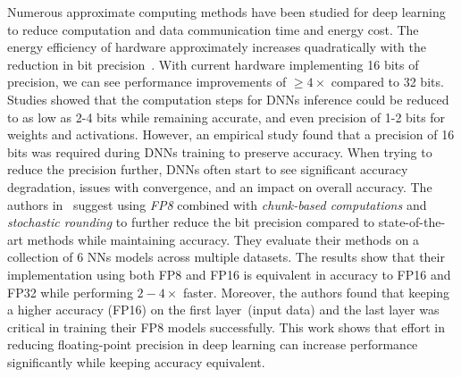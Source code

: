 Numerous approximate computing methods have been studied for deep learning to
reduce computation and data communication time and energy cost.
The energy efficiency of hardware approximately increases quadratically with the reduction in bit precision~\cite{Wang2018-oo}.
With current hardware implementing 16 bits of precision, we can see performance improvements of $\ge 4\times$ compared to 32 bits.
Studies showed that the computation steps for DNNs inference could be reduced to as low as 2-4 bits
while remaining accurate, and even precision of 1-2 bits for weights and activations.
However, an empirical study found that a precision of 16 bits was required during
DNNs training to preserve accuracy.
When trying to reduce the precision further, DNNs often start to see significant
accuracy degradation, issues with convergence, and an impact on overall accuracy.
The authors in~\cite{Wang2018-oo} suggest using \textit{FP8} combined with 
\textit{chunk-based computations} and \textit{stochastic rounding} to further reduce
the bit precision compared to state-of-the-art methods while maintaining accuracy.
They evaluate their methods on a collection of 6 NNs models across multiple datasets.
The results show that their implementation using both FP8 and FP16 is equivalent
in accuracy to FP16 and FP32 while performing $2-4\times$ faster.
Moreover, the authors found that keeping a higher accuracy (FP16) on the first layer~(input data)
and the last layer was critical in training their FP8 models successfully.
This work shows that effort in reducing floating-point precision in deep learning
can increase performance significantly while keeping accuracy equivalent.

